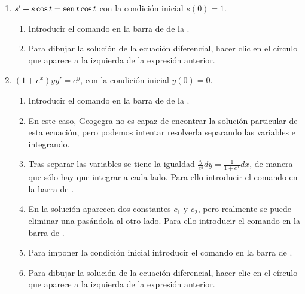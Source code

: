 \begin{enumerate}[leftmargin=*]
\begin{enumerate}
      \item $s'+s\cos t=\operatorname{sen} t\cos t$ con la condición inicial $s(0)=1$.
            \begin{indication}
            \begin{enumerate}
            \item Introducir el comando  en la barra de  de la .
            \item Para dibujar la solución de la ecuación diferencial, hacer clic en el círculo que aparece a la izquierda de la expresión anterior.
            \end{enumerate}
            \end{indication}

      \item $(1+e^x)yy'=e^y$, con la condición inicial $y(0)=0$.
            \begin{indication}
            \begin{enumerate}
            \item Introducir el comando  en la barra de  de la .
            \item En este caso, Geogegra no es capaz de encontrar la solución particular de esta ecuación, pero podemos intentar resolverla separando las variables e integrando.
            \item Tras separar las variables se tiene la igualdad $\frac{y}{e^y}dy = \frac{1}{1+e^x}dx$, de manera que sólo hay que integrar a cada lado.
                  Para ello introducir el comando  en la barra de .
            \item En la solución aparecen dos constantes $c_1$ y $c_2$, pero realmente se puede eliminar una pasándola al otro lado.
                  Para ello introducir el comando  en la barra de .
            \item Para imponer la condición inicial introducir el comando  en la barra de .
            \item Para dibujar la solución de la ecuación diferencial, hacer clic en el círculo que aparece a la izquierda de la expresión anterior.
            \end{enumerate}
            \end{indication}
      \end{enumerate}



\end{enumerate}
